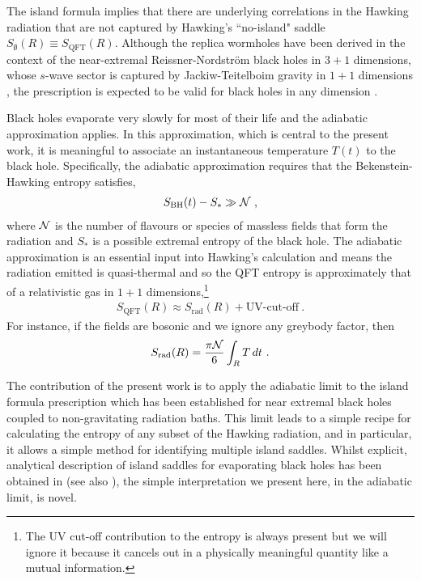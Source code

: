 \documentclass[12pt]{article}
\newcommand\SBH{S_\text{BH}}
\newcommand{\EQ}[1]{\begin{equation}\begin{split} #1
\end{split}\end{equation}}
\begin{document}
The island formula implies that there  are underlying correlations in the Hawking radiation that are not captured by Hawking's ``no-island" saddle $S_\emptyset(R)\equiv S_\text{QFT}(R)$. Although  the replica wormholes have been derived in the context of the near-extremal Reissner-Nordstr\"om black holes in $3+1$ dimensions, whose $s$-wave sector is captured by Jackiw-Teitelboim gravity  in $1+1$ dimensions \cite{Jackiw:1984je,Teitelboim:1983ux}, the prescription is expected to be valid for black holes in any dimension \cite{Penington:2019npb, Almheiri:2019psy}.

Black holes evaporate very slowly for most of  their life and the adiabatic approximation applies. In this approximation, which is central to the present work, it is meaningful to associate an instantaneous temperature $T(t)$ to the black hole. Specifically, the adiabatic approximation requires that the Bekenstein-Hawking entropy satisfies,
\EQ{
\SBH(t)-S_*\gg {\cal N}\ ,
\label{adi}
}
where ${\cal N}$ is the number of flavours or species of massless fields that form the radiation and $S_*$ is a possible extremal entropy of the black hole. The adiabatic approximation is an essential input into Hawking's calculation and means the radiation emitted is quasi-thermal and so the QFT entropy is approximately that of a relativistic gas in $1+1$ dimensions,\footnote{The UV cut-off contribution  to the entropy is always present but we will ignore it because it cancels out in a physically meaningful quantity like a mutual information.}
\EQ{
S_\text{QFT}(R)\approx S_\text{rad}(R)+\text{UV-cut-off}\ .
}
For instance, if the fields are bosonic and we ignore any greybody factor, then
\EQ{
S_\text{rad}(R)=\frac{\pi{\cal N}}6\int_R T\,dt\ .
}

The contribution of the present work is to apply the adiabatic limit to the island formula prescription which has been established for near extremal black holes coupled to non-gravitating radiation baths. 
This limit leads to a simple recipe for calculating the entropy of any subset of the Hawking radiation, and in particular, it allows a simple method for identifying multiple island saddles.   Whilst explicit, analytical description of island saddles for evaporating black holes has been obtained in \cite{Hollowood:2020cou,Hollowood:2020kvk} (see also \cite{Brown:2019rox}), the simple interpretation we present here, in the adiabatic limit, is novel. 
\end{document}
